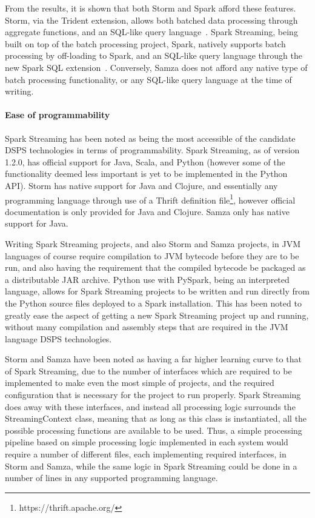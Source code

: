 From the results, it is shown that both Storm and Spark afford these features.
Storm, via the Trident extension, allows both batched data processing through aggregate functions, and an SQL-like query
language~\cite{web:storm-trident}. Spark Streaming, being built on top of the batch processing project, Spark, natively
supports batch processing by off-loading to Spark, and an SQL-like query language through the new Spark SQL extension~\cite{web:sparksql}.
Conversely, Samza does not afford any native type of batch processing functionality, or any SQL-like query language at
the time of writing.


\paragraph{Ease of programmability}

Spark Streaming has been noted as being the most accessible of the candidate DSPS technologies in terms of programmability.
Spark Streaming, as of version 1.2.0, has official support for Java, Scala, and Python (however some of the functionality deemed
less important is yet to be implemented in the Python API). Storm has native support for Java and Clojure, and essentially
any programming language through use of a Thrift definition file\footnote{https://thrift.apache.org/}, however official
documentation is only provided for Java and Clojure. Samza only has native support for Java.

Writing Spark Streaming projects, and also Storm and Samza projects,
in JVM languages of course require compilation to JVM bytecode before they are to be run, and also having the requirement
that the compiled bytecode be packaged as a distributable JAR archive. Python use with PySpark, being an
interpreted language, allows for Spark Streaming projects to be written and run directly from the Python source files
deployed to a Spark installation. This has been noted to greatly ease the aspect of getting a new Spark Streaming project
up and running, without many compilation and assembly steps that are required in the JVM language DSPS technologies.

Storm and Samza have been noted as having a far higher learning curve to that of Spark Streaming, due to the number of
interfaces which are required to be implemented to make even the most simple of projects, and the required configuration
that is necessary for the project to run properly. Spark Streaming does away with these interfaces, and instead all processing
logic surrounds the StreamingContext class, meaning that as long as this class is instantiated, all the possible processing
functions are available to be used. Thus, a simple processing pipeline based on simple processing logic implemented in each
system would require a number of different files, each implementing required interfaces, in Storm and Samza, while the
same logic in Spark Streaming could be done in a number of lines in any supported programming language.

